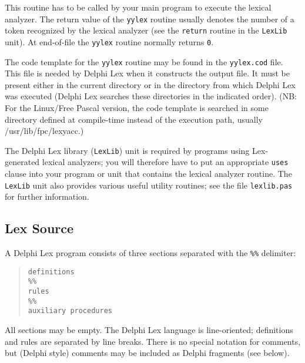 \documentclass[a4paper]{article}
\begin{document}
This routine has to be called by your main program to execute the lexical
analyzer. The return value of the \verb"yylex" routine usually denotes the
number of a token recognized by the lexical analyzer (see the \verb"return"
routine in the \verb"LexLib" unit). At end-of-file the \verb"yylex" routine
normally returns \verb"0".

The code template for the \verb"yylex" routine may be found in the
\verb"yylex.cod" file. This file is needed by Delphi Lex when it constructs the
output file. It must be present either in the current directory or in the
directory from which Delphi Lex was executed (Delphi Lex searches these directories in
the indicated order). (NB: For the Linux/Free Pascal version, the code
template is searched in some directory defined at compile-time instead of the
execution path, usually /usr/lib/fpc/lexyacc.)

The Delphi Lex library (\verb"LexLib") unit is required by programs using
Lex-generated lexical analyzers; you will therefore have to put an appropriate
\verb"uses" clause into your program or unit that contains the lexical
analyzer routine. The \verb"LexLib" unit also provides various useful utility
routines; see the file \verb"lexlib.pas" for further information.

\subsection{Lex Source}

A Delphi Lex program consists of three sections separated with the \verb"%%"
delimiter:

\begin{quote}\begin{verbatim}
definitions
%%
rules
%%
auxiliary procedures
\end{verbatim}\end{quote}

All sections may be empty. The Delphi Lex language is line-oriented; definitions
and rules are separated by line breaks. There is no special notation for
comments, but (Delphi style) comments may be included as Delphi
fragments (see below).
\end{document}
